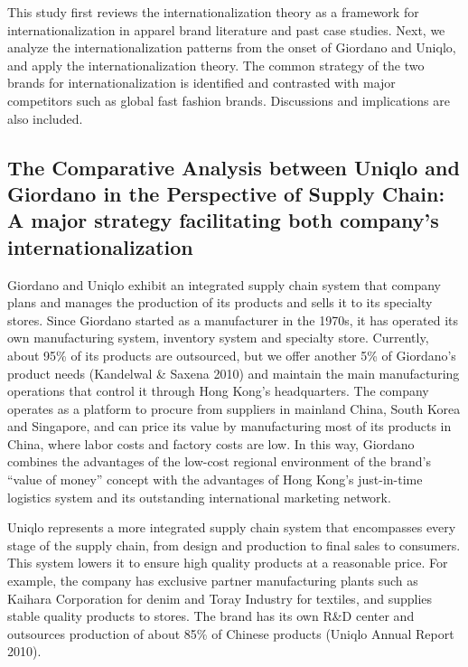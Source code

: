\documentclass[12pt,a4paper]{article}
\begin{document}
This study first reviews the internationalization theory as a framework
for internationalization in apparel brand literature and past case
studies. Next, we analyze the internationalization patterns from the
onset of Giordano and Uniqlo, and apply the internationalization theory.
The common strategy of the two brands for internationalization is
identified and contrasted with major competitors such as global fast
fashion brands. Discussions and implications are also included.

\hypertarget{the-comparative-analysis-between-uniqlo-and-giordano-in-the-perspective-of-supply-chain-a-major-strategy-facilitating-both-companys-internationalization}{%
\subsection{The Comparative Analysis between Uniqlo and Giordano in the
Perspective of Supply Chain: A major strategy facilitating both
company's
internationalization}\label{the-comparative-analysis-between-uniqlo-and-giordano-in-the-perspective-of-supply-chain-a-major-strategy-facilitating-both-companys-internationalization}}

Giordano and Uniqlo exhibit an integrated supply chain system that
company plans and manages the production of its products and sells it to
its specialty stores. Since Giordano started as a manufacturer in the
1970s, it has operated its own manufacturing system, inventory system
and specialty store. Currently, about 95\% of its products are
outsourced, but we offer another 5\% of Giordano's product needs
(Kandelwal \& Saxena 2010) and maintain the main manufacturing
operations that control it through Hong Kong's headquarters. The company
operates as a platform to procure from suppliers in mainland China,
South Korea and Singapore, and can price its value by manufacturing most
of its products in China, where labor costs and factory costs are low.
In this way, Giordano combines the advantages of the low-cost regional
environment of the brand's ``value of money'' concept with the
advantages of Hong Kong's just-in-time logistics system and its
outstanding international marketing network.

Uniqlo represents a more integrated supply chain system that encompasses
every stage of the supply chain, from design and production to final
sales to consumers. This system lowers it to ensure high quality
products at a reasonable price. For example, the company has exclusive
partner manufacturing plants such as Kaihara Corporation for denim and
Toray Industry for textiles, and supplies stable quality products to
stores. The brand has its own R\&D center and outsources production of
about 85\% of Chinese products (Uniqlo Annual Report 2010).
\end{document}
